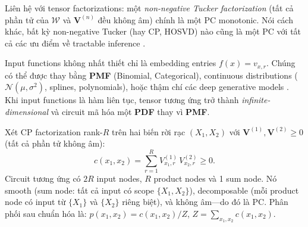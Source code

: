 Liên hệ với tensor factorizations: một \emph{non-negative Tucker factorization}
(tất cả phần tử của $\mathcal{W}$ và $\mathbf{V}^{(n)}$ đều không âm) chính là
một PC monotonic.  Nói cách khác, bất kỳ non-negative Tucker (hay CP, HOSVD) nào
cũng là một PC với tất cả các ưu điểm về tractable inference \cite{loconte2025relationship}.

Input functions không nhất thiết chỉ là embedding entries $f(x) = v_{x,r}$.  Chúng
có thể được thay bằng \textbf{PMF} (Binomial, Categorical),
continuous distributions ($\mathcal{N}(\mu,\sigma^2)$, splines, polynomials), hoặc
thậm chí các deep generative models \cite{loconte2025relationship}. Khi input functions là hàm liên tục, tensor
tương ứng trở thành \emph{infinite-dimensional} và circuit mã hóa một \textbf{PDF} thay vì \textbf{PMF}.

\begin{example}
\label{ex:nn-cp-pc}
Xét CP factorization rank-$R$ trên hai biến rời rạc $(X_1, X_2)$ với
$\mathbf{V}^{(1)}, \mathbf{V}^{(2)} \geq 0$ (tất cả phần tử không âm):
\begin{equation}
    c(x_1, x_2) = \sum_{r=1}^{R} V^{(1)}_{x_1, r}\, V^{(2)}_{x_2, r} \geq 0.
\end{equation}
Circuit tương ứng có $2R$ input nodes, $R$ product nodes và 1 sum node.  Nó smooth
(sum node: tất cả input có scope $\{X_1, X_2\}$), decomposable (mỗi product node
có input từ $\{X_1\}$ và $\{X_2\}$ riêng biệt), và không âm---do đó là PC.
Phân phối sau chuẩn hóa là:
$p(x_1, x_2) = c(x_1, x_2) / Z$, $Z = \sum_{x_1, x_2} c(x_1, x_2)$.
\end{example}


